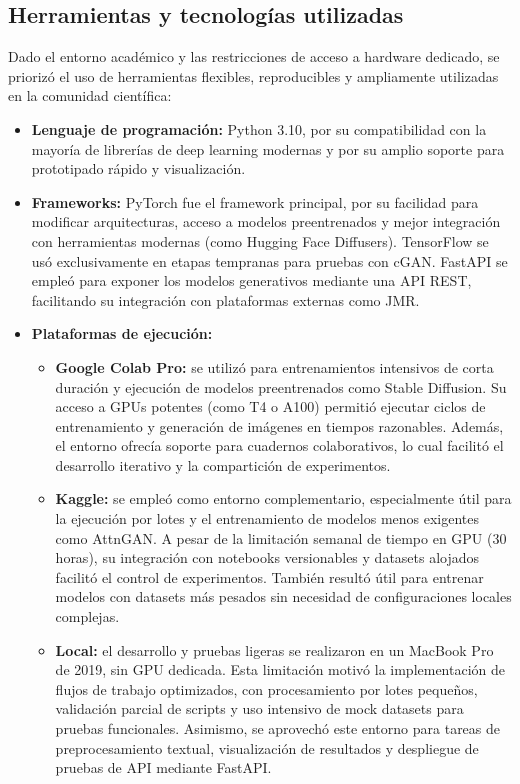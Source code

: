 \subsection{Herramientas y tecnologías utilizadas}

Dado el entorno académico y las restricciones de acceso a hardware dedicado, se priorizó el uso de herramientas flexibles, reproducibles y ampliamente utilizadas en la comunidad científica:

\begin{itemize}
\item \textbf{Lenguaje de programación:} Python 3.10, por su compatibilidad con la mayoría de librerías de deep learning modernas y por su amplio soporte para prototipado rápido y visualización.


\item \textbf{Frameworks:} PyTorch fue el framework principal, por su facilidad para modificar arquitecturas, acceso a modelos preentrenados y mejor integración con herramientas modernas (como Hugging Face Diffusers). TensorFlow se usó exclusivamente en etapas tempranas para pruebas con cGAN. FastAPI se empleó para exponer los modelos generativos mediante una API REST, facilitando su integración con plataformas externas como JMR.

\item \textbf{Plataformas de ejecución:} 
    \begin{itemize}
        \item \textbf{Google Colab Pro:} se utilizó para entrenamientos intensivos de corta duración y ejecución de modelos preentrenados como Stable Diffusion. Su acceso a GPUs potentes (como T4 o A100) permitió ejecutar ciclos de entrenamiento y generación de imágenes en tiempos razonables. Además, el entorno ofrecía soporte para cuadernos colaborativos, lo cual facilitó el desarrollo iterativo y la compartición de experimentos.
        
        \item \textbf{Kaggle:} se empleó como entorno complementario, especialmente útil para la ejecución por lotes y el entrenamiento de modelos menos exigentes como AttnGAN. A pesar de la limitación semanal de tiempo en GPU (30 horas), su integración con notebooks versionables y datasets alojados facilitó el control de experimentos. También resultó útil para entrenar modelos con datasets más pesados sin necesidad de configuraciones locales complejas.
        
        \item \textbf{Local:} el desarrollo y pruebas ligeras se realizaron en un MacBook Pro de 2019, sin GPU dedicada. Esta limitación motivó la implementación de flujos de trabajo optimizados, con procesamiento por lotes pequeños, validación parcial de scripts y uso intensivo de mock datasets para pruebas funcionales. Asimismo, se aprovechó este entorno para tareas de preprocesamiento textual, visualización de resultados y despliegue de pruebas de API mediante FastAPI.
    \end{itemize}


\end{itemize}
